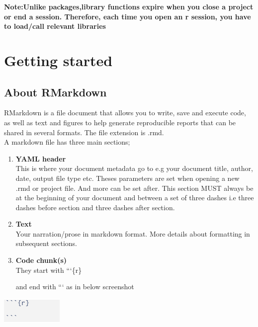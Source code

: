 \documentclass[
]{book}
\let\origfigure\figure
\let\endorigfigure\endfigure
\renewenvironment{figure}[1][2] {
    \expandafter\origfigure\expandafter[H]
} {
    \endorigfigure
}
\begin{document}
\textbf{Note:Unlike packages,library functions expire when you close a project or end a session. Therefore, each time you open an r session, you have to load/call relevant libraries}

\hypertarget{getting-started-1}{%
\chapter{Getting started}\label{getting-started-1}}

\hypertarget{about-rmarkdown}{%
\section{About RMarkdown}\label{about-rmarkdown}}

RMarkdown is a file document that allows you to write, save and execute code, as well as text and figures to help generate reproducible reports that can be shared in several formats.
The file extension is .rmd.\\
A markdown file has three main sections;

\begin{enumerate}
\def\labelenumi{\arabic{enumi}.}
\item
  \textbf{YAML header}\\
  This is where your document metadata go to e.g your document title, author, date, output file type etc.
  Theses parameters are set when opening a new .rmd or project file. And more can be set after.
  This section MUST always be at the beginning of your document and between a set of three dashes i.e three dashes before section and three dashes after section.
\item
  \textbf{Text}\\
  Your narration/prose in markdown format. More details about formatting in subsequent sections.
\item
  \textbf{Code chunk(s)}\\
  They start with ```\{r\}

  and end with ```
  as in below screenshot
\end{enumerate}

\begin{figure}
\centering
\includegraphics{tutorial_screenshots/codechunk_blank.png}
\caption{code chunk}
\end{figure}
\end{document}
